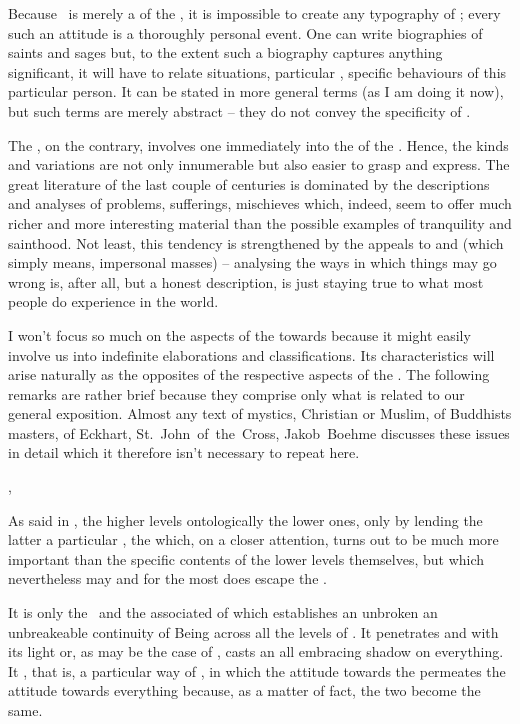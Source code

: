 Because \yes\ is merely a  of the , it is 
impossible to create any typography of ; every such an 
attitude is a thoroughly personal event. One can write biographies of 
saints and sages but, to the extent such a biography captures anything 
significant, it will have to relate  situations, 
particular , specific behaviours of this particular person. 
It can be stated in more general terms (as I am doing it now), but 
such terms are merely abstract   -- they do not convey the 
 specificity of \yes. 

The , on the contrary, involves one immediately into the
 of the .  Hence, the kinds and
variations are not only innumerable but also easier to grasp and
express.  The great literature of the last couple of centuries is
dominated by the descriptions and analyses of problems, sufferings,
mischieves which, indeed, seem to offer much richer and more
interesting material than the possible examples of tranquility and
sainthood.  Not least, this tendency is strengthened by the appeals to
 and  
(which simply means, impersonal masses) -- analysing
the ways in which things may go wrong is, after all, but a honest
description, is just staying true to what most people do experience in
the world.

\pa
I won't focus so much on the aspects of the  towards 
 because it might easily involve us into indefinite 
elaborations and classifications. Its characteristics will arise 
naturally as the opposites of the respective aspects of the 
. The following remarks are rather brief because they 
comprise only what is related to our general exposition. Almost any 
text of mystics, Christian or Muslim, of Buddhists masters,
of Eckhart, St.~John~of~the~Cross, Jakob~Boehme discusses these issues 
in detail which it therefore isn't necessary to repeat here.

\sep

\pa
As said in , the higher levels
 ontologically the lower ones, only by lending the 
latter a particular , the  which, on a closer 
attention, turns out to be much more important than the specific 
contents of the lower levels themselves, but which nevertheless may 
and for the most does escape the .

It is only the \sch\ and the associated  of  which establishes an unbroken an unbreakeable continuity of
Being across all the levels of .  It penetrates  and  with its light or, as may be the case of \No,
casts an all embracing shadow on everything.  It , that is,  a particular
way of , in which the attitude towards the 
permeates the attitude towards everything because, as a matter of
fact, the two become the same.

